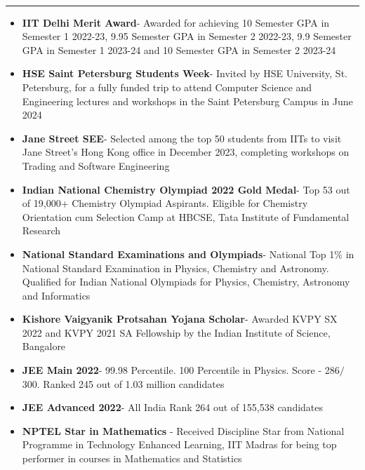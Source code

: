 \documentclass[9pt, letterpaper]{article}
\begin{document}
{
\noindent\fontsize{10}{12} \selectfont{ACHIEVEMENTS}
\\
\hrule \relax
}
\begin{itemize}[noitemsep]
    \item \textbf{IIT Delhi Merit Award}- Awarded for achieving 10 Semester GPA in Semester 1 2022-23, 9.95 Semester GPA in Semester 2 2022-23, 9.9 Semester GPA in Semester 1 2023-24 and 10 Semester GPA in Semester 2 2023-24
    \item \textbf{HSE Saint Petersburg Students Week}- Invited by HSE University, St. Petersburg, for a fully funded trip to attend Computer Science and Engineering lectures and workshops in the Saint Petersburg Campus in June 2024
    \item \textbf{Jane Street SEE}- Selected among the top 50 students from IITs to visit Jane Street's Hong Kong office in December 2023, completing workshops on Trading and Software Engineering
    \item \textbf{Indian National Chemistry Olympiad 2022 Gold Medal}- Top 53 out of 19,000+ Chemistry Olympiad Aspirants. Eligible for Chemistry Orientation cum Selection Camp at HBCSE, Tata Institute of Fundamental Research
    \item \textbf{National Standard Examinations and Olympiads}- National Top 1$\%$ in National Standard Examination in Physics, Chemistry and Astronomy. Qualified for Indian National Olympiads for Physics, Chemistry, Astronomy and Informatics  
    \item \textbf{Kishore Vaigyanik Protsahan Yojana Scholar}- Awarded KVPY SX 2022 and KVPY 2021 SA 
Fellowship by the Indian Institute of Science, Bangalore
\item \textbf{JEE Main 2022}- 99.98 Percentile. 100 Percentile in Physics. Score - 286$/$300. Ranked 245 out of 1.03 million candidates
\item \textbf{JEE Advanced 2022}- All India Rank 264 out of 155,538 candidates
\item \textbf{NPTEL Star in Mathematics} -  Received Discipline Star from National Programme in Technology Enhanced Learning, IIT Madras for being top performer in courses in Mathematics and Statistics

\end{itemize}


\end{document}
